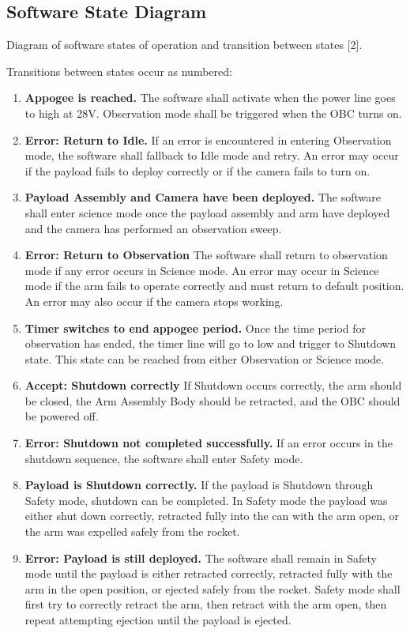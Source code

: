 \subsection{Software State Diagram}

\begin{center}
Diagram of software states of operation and transition between states [2].

Transitions between states occur as numbered:

\begin{enumerate}
\item{\textbf{Appogee is reached.} The software shall activate when the power line goes to high at 28V. Observation mode shall be triggered when the OBC turns on.}
\item{\textbf{Error: Return to Idle.} If an error is encountered in entering Observation mode, the software shall fallback to Idle mode and retry. An error may occur if the payload fails to deploy correctly or if the camera fails to turn on.}
\item{\textbf{Payload Assembly and Camera have been deployed.} The software shall enter science mode once the payload assembly and arm have deployed and the camera has performed an observation sweep.}
\item{\textbf{Error: Return to Observation} The software shall return to observation mode if any error occurs in Science mode. An error may occur in Science mode if the arm fails to operate correctly and must return to default position. An error may also occur if the camera stops working.}
\item{\textbf{Timer switches to end appogee period.} Once the time period for observation has ended, the timer line will go to low and trigger to Shutdown state. This state can be reached from either Observation or Science mode.}
\item{\textbf{Accept: Shutdown correctly} If Shutdown occurs correctly, the arm should be closed, the Arm Assembly Body should be retracted, and the OBC should be powered off.}
\item{\textbf{Error: Shutdown not completed successfully.} If an error occurs in the shutdown sequence, the software shall enter Safety mode.}
\item{\textbf{Payload is Shutdown correctly.} If the payload is Shutdown through Safety mode, shutdown can be completed. In Safety mode the payload was either shut down correctly, retracted fully into the can with the arm open, or the arm was expelled safely from the rocket.}
\item{\textbf{Error: Payload is still deployed.} The software shall remain in Safety mode until the payload is either retracted correctly, retracted fully with the arm in the open position, or ejected safely from the rocket. Safety mode shall first try to correctly retract the arm, then retract with the arm open, then repeat attempting ejection until the payload is ejected.}
\end{enumerate}
\end{center}

